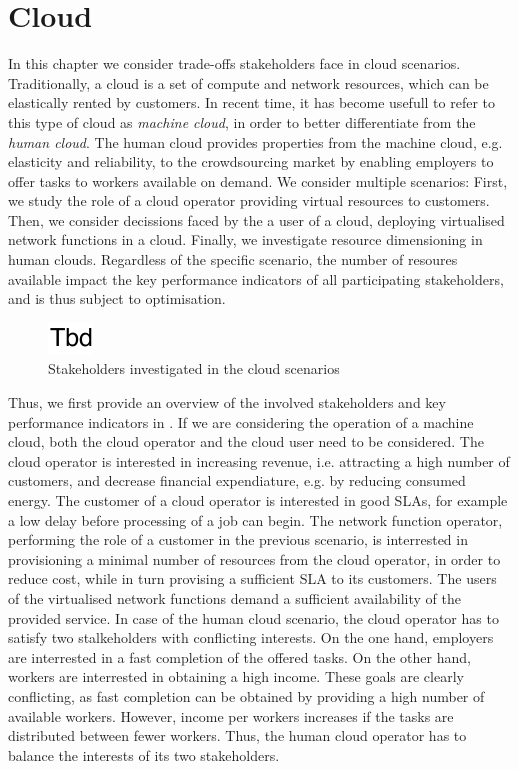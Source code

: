 \chapter{Cloud}\label{chap:cloud}

In this chapter we consider trade-offs stakeholders face in cloud scenarios.
Traditionally, a cloud is a set of compute and network resources, which can be elastically rented by customers.
In recent time, it has become usefull to refer to this type of cloud as \emph{machine cloud}, in order to better differentiate from the \emph{human cloud}.
The human cloud provides properties from the machine cloud, e.g. elasticity and reliability, to the crowdsourcing market by enabling employers to offer tasks to workers available on demand.
We consider multiple scenarios:
First, we study the role of a cloud operator providing virtual resources to customers.
Then, we consider decissions faced by the a user of a cloud, deploying virtualised network functions in a cloud.
Finally, we investigate resource dimensioning in human clouds.
Regardless of the specific scenario, the number of resoures available impact the key performance indicators of all participating stakeholders, and is thus subject to optimisation.

\begin{figure}
  \centering
  \includegraphics{cloud/figures/model}
  \caption{Stakeholders investigated in the cloud scenarios}
  \label{fig:cloud:model}
\end{figure}

Thus, we first provide an overview of the involved stakeholders and key performance indicators in .
If we are considering the operation of a machine cloud, both the cloud operator and the cloud user need to be considered.
The cloud operator is interested in increasing revenue, i.e. attracting a high number of customers, and decrease financial expendiature, e.g. by reducing consumed energy.
The customer of a cloud operator is interested in good \glspl{SLA}, for example a low delay before processing of a job can begin.
The network function operator, performing the role of a customer in the previous scenario, is interrested in provisioning a minimal number of resources from the cloud operator, in order to reduce cost, while in turn provising a sufficient \gls{SLA} to its customers.
The users of the virtualised network functions demand a sufficient availability of the provided service.
In case of the human cloud scenario, the cloud operator has to satisfy two stalkeholders with conflicting interests.
On the one hand, employers are interrested in a fast completion of the offered tasks.
On the other hand, workers are interrested in obtaining a high income.
These goals are clearly conflicting, as fast completion can be obtained by providing a high number of available workers.
However, income per workers increases if the tasks are distributed between fewer workers.
Thus, the human cloud operator has to balance the interests of its two stakeholders.

